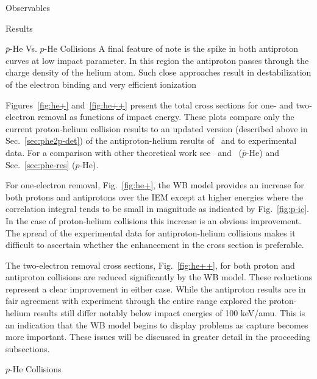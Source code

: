\documentclass[letterpaper, 11 pt]{report}
\begin{document}
\begin{chapter}{Observables \label{chap:p-he2p-he}}
\begin{section}{Results \label{sec:phe2p-res}}
\begin{subsection}{ \texorpdfstring{$\bar{p}$}{pbar}-He Vs. \texorpdfstring{$p$}{p}-He Collisions
                         \label{sec:pbarhe-res}}
         A final feature of note is the spike in both antiproton curves at low impact parameter. In this
         region the antiproton passes through the charge density of the helium atom. Such close
         approaches result in destabilization of the electron binding and very efficient
         ionization~\cite{pbarhe-rev}

         Figures~\ref{fig:he+} and~\ref{fig:he++} present the total cross sections for one- and
         two-electron removal as functions of impact energy. These plots compare only the current
         proton-helium collision results to an updated version (described above in
         Sec.~\ref{sec:phe2p-det}) of the antiproton-helium results of~\cite{pbarhe} and to
         experimental data. For a comparison with other theoretical work see~\cite{pbarhe}
         and~\cite{new-pbarhe} ($\bar{p}$-He) and Sec.~\ref{sec:phe-res} ($p$-He).
   
         For one-electron removal, Fig.~\ref{fig:he+}, the WB model provides an increase for both protons
         and antiprotons over the IEM except at higher energies where the correlation integral tends to
         be small in magnitude as indicated by Fig.~\ref{fig:p-ic}. In the case of proton-helium
         collisions this increase is an obvious improvement. The spread of the experimental data for
         antiproton-helium collisions makes it difficult to ascertain whether the enhancement in the
         cross section is preferable.
   
         The two-electron removal cross sections, Fig.~\ref{fig:he++}, for both proton and antiproton
         collisions are reduced significantly by the WB model. These reductions represent a clear
         improvement in either case. While the antiproton results are in fair agreement with experiment
         through the entire range explored the proton-helium results still differ notably below impact
         energies of 100 keV/amu. This is an indication that the WB model begins to display problems as
         capture becomes more important. These issues will be discussed in greater detail in the
         proceeding subsections.

      \end{subsection}

      \begin{subsection}{\texorpdfstring{$p$}{p}-He Collisions \label{sec:phe-res}}

         \begin{figure}[ht]
            \begin{minipage}{.49\linewidth}
               

\end{minipage}
\end{figure}
\end{subsection}
\end{section}
\end{chapter}
\end{document}
